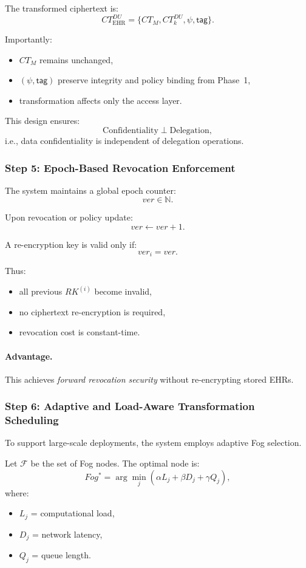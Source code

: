 \documentclass[conference]{IEEEtran}
\begin{document}
The transformed ciphertext is:
\[
CT_{\text{EHR}}^{DU} = \{CT_M, CT_k^{DU}, \psi, \mathsf{tag}\}.
\]

Importantly:
\begin{itemize}
    \item $CT_M$ remains unchanged,
    \item $(\psi, \mathsf{tag})$ preserve integrity and policy binding from Phase~1,
    \item transformation affects only the access layer.
\end{itemize}

This design ensures:
\[
\text{Confidentiality} \perp \text{Delegation},
\]
i.e., data confidentiality is independent of delegation operations.

\subsubsection*{Step 5: Epoch-Based Revocation Enforcement}

The system maintains a global epoch counter:
\[
ver \in \mathbb{N}.
\]

Upon revocation or policy update:
\[
ver \leftarrow ver + 1.
\]

A re-encryption key is valid only if:
\[
ver_i = ver.
\]

Thus:
\begin{itemize}
    \item all previous $RK^{(i)}$ become invalid,
    \item no ciphertext re-encryption is required,
    \item revocation cost is constant-time.
\end{itemize}

\paragraph{Advantage.}
This achieves \emph{forward revocation security} without re-encrypting stored EHRs.

\subsubsection*{Step 6: Adaptive and Load-Aware Transformation Scheduling}

To support large-scale deployments, the system employs adaptive Fog selection.

Let $\mathcal{F}$ be the set of Fog nodes. The optimal node is:
\[
Fog^* = \arg\min_{j} \left( \alpha L_j + \beta D_j + \gamma Q_j \right),
\]
where:
\begin{itemize}
    \item $L_j$ = computational load,
    \item $D_j$ = network latency,
    \item $Q_j$ = queue length.
\end{itemize}
\end{document}
